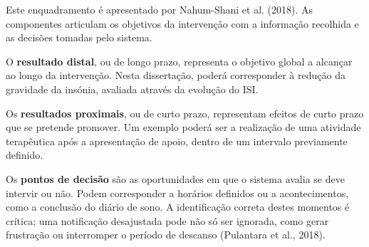 \begin{table}[]
	\centering
	\caption{Componentes fundamentais de uma JITAI}
	\label{tab:jitai}
\end{table}

Este enquadramento é apresentado por Nahum-Shani et al. (2018). As componentes articulam os objetivos da intervenção com a informação recolhida e as decisões tomadas pelo sistema.

O \textbf{resultado distal}, ou de longo prazo, representa o objetivo global a alcançar ao longo da intervenção. Nesta dissertação, poderá corresponder à redução da gravidade da insónia, avaliada através da evolução do ISI.

Os \textbf{resultados proximais}, ou de curto prazo, representam efeitos de curto prazo que se pretende promover. Um exemplo poderá ser a realização de uma atividade terapêutica após a apresentação de apoio, dentro de um intervalo previamente definido.

Os \textbf{pontos de decisão} são as oportunidades em que o sistema avalia se deve intervir ou não. Podem corresponder a horários definidos ou a acontecimentos, como a conclusão do diário de sono. A identificação correta destes momentos é crítica; uma notificação desajustada pode não só ser ignorada, como gerar frustração ou interromper o período de descanso (Pulantara et al., 2018).

